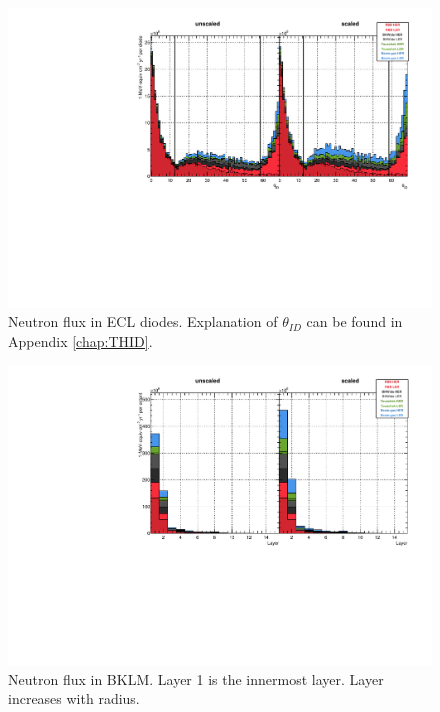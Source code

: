 \begin{figure}[htb]
	\centerfloat
		\includegraphics[width=\textwidth]{images/hECLFluxTID}
	\caption[Neutron flux in ECL diodes]{Neutron flux in ECL diodes. Explanation of $\theta_{ID}$ can be found in Appendix \ref{chap:THID}.}	
	\label{fig:ECLFlux}
\end{figure}

\begin{figure}[htb]
	\centerfloat
		\includegraphics[width=\textwidth]{images/hBKLMFlux}
	\caption[Neutron flux in BKLM]{Neutron flux in BKLM. Layer 1 is the innermost layer. Layer increases with radius.}	
	\label{fig:BKLMFlux}
\end{figure}

